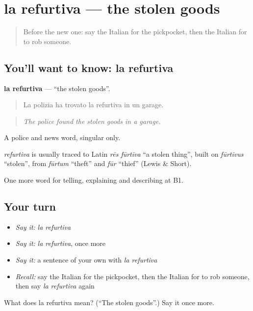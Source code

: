 \section[la refurtiva]{la refurtiva — the stolen goods}

\label{lesson:IT-C291-refurtiva}



\begin{quote}
Before the new one: say the Italian for the pickpocket, then the Italian for to rob someone.
\end{quote}

\subsection*{You'll want to know: la refurtiva}
\textbf{la refurtiva} — \textquotedblleft{}the stolen goods\textquotedblright{}.

\begin{quote}
La polizia ha trovato la refurtiva in un garage.
\end{quote}

\begin{quote}
\emph{The police found the stolen goods in a garage.}
\end{quote}

A police and news word, singular only.

\begin{cousinweb}
\emph{refurtiva} is usually traced to Latin \emph{rēs fūrtīva} \textquotedblleft{}a stolen thing\textquotedblright{}, built on \emph{fūrtīvus} \textquotedblleft{}stolen\textquotedblright{}, from \emph{fūrtum} \textquotedblleft{}theft\textquotedblright{} and \emph{fūr} \textquotedblleft{}thief\textquotedblright{} (Lewis \& Short).
\end{cousinweb}

\begin{grammarlens}[title={What you've built}]
One more word for telling, explaining and describing at B1.
\end{grammarlens}

\subsection*{Your turn}
\begin{itemize}
\raggedright
  \item \emph{Say it:} \emph{la refurtiva}
  \item \emph{Say it:} \emph{la refurtiva}, once more
  \item \emph{Say it:} a sentence of your own with \emph{la refurtiva}
  \item \emph{Recall:} say the Italian for the pickpocket, then the Italian for to rob someone, then say \emph{la refurtiva} again
\end{itemize}

\begin{tcolorbox}[breakable,colback=teal!4,colframe=teal!35!black,title={Before you move on}]
What does la refurtiva mean? (\textquotedblleft{}The stolen goods\textquotedblright{}.) Say it once more.
\end{tcolorbox}
